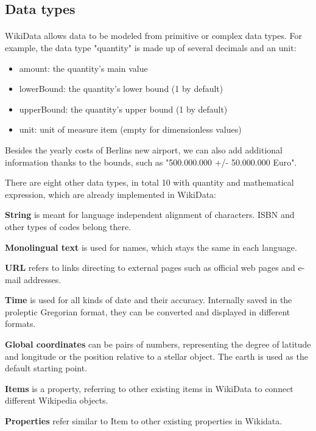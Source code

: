 \documentclass[12pt]{article}
\begin{document}
\subsection{Data types}
\paragraph{}
WikiData allows data to be modeled from primitive or complex data types. For example, the data type "quantity" is made up of several decimals and an unit:

\begin{itemize}
\item	amount: the quantity's main value
\item	lowerBound: the quantity's lower bound (1 by default)
\item	upperBound: the quantity's upper bound (1 by default)
\item	unit: unit of measure item (empty for dimensionless values)
\end{itemize}

Besides the yearly costs of Berlins new airport, we can also add additional information thanks to the bounds, such as "500.000.000 +/- 50.000.000 Euro". 

There are eight other data types, in total 10 with quantity and mathematical expression, which are already implemented in WikiData:

\textbf{String} is meant for language independent alignment of characters. ISBN and other types of codes belong there.

\textbf{Monolingual text} is used for names, which stays the same in each language. 

\textbf{URL} refers to links directing to external pages such as official web pages and e-mail addresses.

\textbf{Time} is used for all kinds of date and their accuracy. Internally saved in the proleptic Gregorian format, they can be converted and displayed in different formats.

\textbf{Global coordinates} can be pairs of numbers, representing the degree of latitude and longitude or the position relative to a stellar object. The earth is used as the default starting point.

\textbf{Items} is a property, referring to other existing items in WikiData to connect different Wikipedia objects. 

\textbf{Properties} refer similar to Item to other existing properties in Wikidata.
\end{document}
